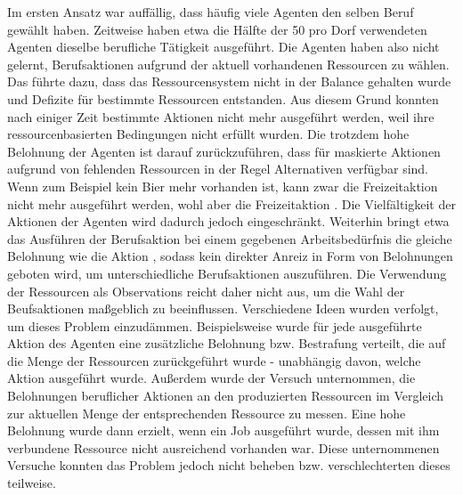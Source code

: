 Im ersten Ansatz war auffällig, dass häufig viele Agenten den selben Beruf gewählt haben. Zeitweise haben etwa die Hälfte der 50 pro Dorf verwendeten Agenten dieselbe berufliche Tätigkeit ausgeführt. Die Agenten haben also nicht gelernt, Berufsaktionen aufgrund der aktuell vorhandenen Ressourcen zu wählen. Das führte dazu, dass das Ressourcensystem nicht in der Balance gehalten wurde und Defizite für bestimmte Ressourcen entstanden. Aus diesem Grund konnten nach einiger Zeit bestimmte Aktionen nicht mehr ausgeführt werden, weil ihre ressourcenbasierten Bedingungen nicht erfüllt wurden. Die trotzdem hohe Belohnung der Agenten ist darauf zurückzuführen, dass für maskierte Aktionen aufgrund von fehlenden Ressourcen in der Regel Alternativen verfügbar sind. Wenn zum Beispiel kein Bier mehr vorhanden ist, kann zwar die Freizeitaktion  nicht mehr ausgeführt werden, wohl aber die Freizeitaktion . Die Vielfältigkeit der Aktionen der Agenten wird dadurch jedoch eingeschränkt. Weiterhin bringt etwa das Ausführen der Berufsaktion  bei einem gegebenen Arbeitsbedürfnis die gleiche Belohnung wie die Aktion , sodass kein direkter Anreiz in Form von Belohnungen geboten wird, um unterschiedliche Berufsaktionen auszuführen. Die Verwendung der Ressourcen als Observations reicht daher nicht aus, um die Wahl der Beufsaktionen maßgeblich zu beeinflussen.
Verschiedene Ideen wurden verfolgt, um dieses Problem einzudämmen. Beispielsweise wurde für jede ausgeführte Aktion des Agenten eine zusätzliche Belohnung bzw. Bestrafung verteilt, die auf die Menge der Ressourcen zurückgeführt wurde - unabhängig davon, welche Aktion ausgeführt wurde. Außerdem wurde der Versuch unternommen, die Belohnungen beruflicher Aktionen an den produzierten Ressourcen im Vergleich zur aktuellen Menge der entsprechenden Ressource zu messen. Eine hohe Belohnung wurde dann erzielt, wenn ein Job ausgeführt wurde, dessen mit ihm verbundene Ressource nicht ausreichend vorhanden war.
Diese unternommenen Versuche konnten das Problem jedoch nicht beheben bzw. verschlechterten dieses teilweise. 

